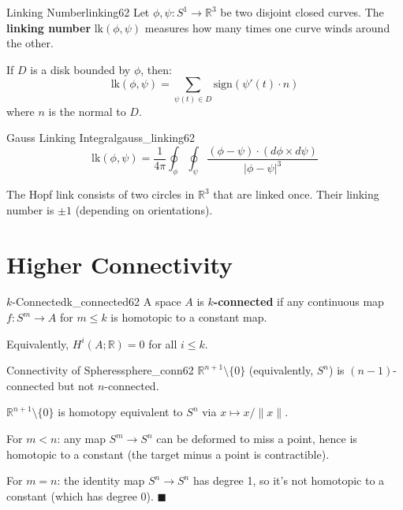 \documentclass[11pt, letterpaper, openany]{book}
\renewenvironment{proof}[1][\proofname]{%
  \tcolorbox[blanker, breakable, left=1em,
    before skip=1em, after skip=1em,
    borderline west={2pt}{0pt}{MagicTeal!50},
    colback=MagicCream,
    before upper={\textcolor{MagicTeal}{\sffamily\bfseries #1.}\space}
  ]%
}{%
  \hfill\textcolor{MagicTeal}{\ensuremath{\blacksquare}}\endtcolorbox%
}
\begin{document}
\begin{defn}{Linking Number}{linking62}
Let $\phi, \psi: S^1 \to \mathbb{R}^3$ be two disjoint closed curves. The \textbf{linking number} $\text{lk}(\phi, \psi)$ measures how many times one curve winds around the other.

If $D$ is a disk bounded by $\phi$, then:
\[
\text{lk}(\phi, \psi) = \sum_{\psi(t) \in D} \text{sign}(\psi'(t) \cdot n)
\]
where $n$ is the normal to $D$.
\end{defn}

\begin{thm}{Gauss Linking Integral}{gauss_linking62}
\[
\text{lk}(\phi, \psi) = \frac{1}{4\pi} \oint_\phi \oint_\psi \frac{(\phi - \psi) \cdot (d\phi \times d\psi)}{|\phi - \psi|^3}
\]
\end{thm}

\begin{example}
The Hopf link consists of two circles in $\mathbb{R}^3$ that are linked once. Their linking number is $\pm 1$ (depending on orientations).
\end{example}

\section{Higher Connectivity}

\begin{defn}{$k$-Connected}{k_connected62}
A space $A$ is \textbf{$k$-connected} if any continuous map $f: S^m \to A$ for $m \leq k$ is homotopic to a constant map.

Equivalently, $H^i(A; \mathbb{R}) = 0$ for all $i \leq k$.
\end{defn}

\begin{thm}{Connectivity of Spheres}{sphere_conn62}
$\mathbb{R}^{n+1} \setminus \{0\}$ (equivalently, $S^n$) is $(n-1)$-connected but not $n$-connected.
\end{thm}

\begin{proof}[Sketch]
$\mathbb{R}^{n+1} \setminus \{0\}$ is homotopy equivalent to $S^n$ via $x \mapsto x/\|x\|$.

For $m < n$: any map $S^m \to S^n$ can be deformed to miss a point, hence is homotopic to a constant (the target minus a point is contractible).

For $m = n$: the identity map $S^n \to S^n$ has degree 1, so it's not homotopic to a constant (which has degree 0).
\end{proof}
\end{document}
